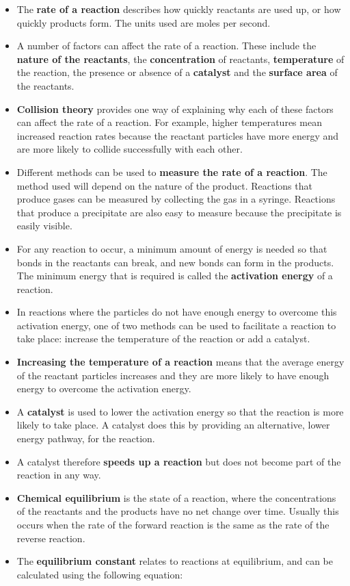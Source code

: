 \begin{itemize}
\item{The \textbf{rate of a reaction} describes how quickly reactants are used up, or how quickly products form. The units used are moles per second.}
\item{A number of factors can affect the rate of a reaction. These include the \textbf{nature of the reactants}, the \textbf{concentration} of reactants, \textbf{temperature} of the reaction, the presence or absence of a \textbf{catalyst} and the \textbf{surface area} of the reactants.}
\item{\textbf{Collision theory} provides one way of explaining why each of these factors can affect the rate of a reaction. For example, higher temperatures mean increased reaction rates because the reactant particles have more energy and are more likely to collide successfully with each other.}
\item{Different methods can be used to \textbf{measure the rate of a reaction}. The method used will depend on the nature of the product. Reactions that produce gases can be measured by collecting the gas in a syringe. Reactions that produce a precipitate are also easy to measure because the precipitate is easily visible.}
\item{For any reaction to occur, a minimum amount of energy is needed so that bonds in the reactants can break, and new bonds can form in the products. The minimum energy that is required is called the \textbf{activation energy} of a reaction.}
\item{In reactions where the particles do not have enough energy to overcome this activation energy, one of two methods can be used to facilitate a reaction to take place: increase the temperature of the reaction or add a catalyst.}
\item{\textbf{Increasing the temperature of a reaction} means that the average energy of the reactant particles increases and they are more likely to have enough energy to overcome the activation energy.}
\item{A \textbf{catalyst} is used to lower the activation energy so that the reaction is more likely to take place. A catalyst does this by providing an alternative, lower energy pathway, for the reaction.}
\item{A catalyst therefore \textbf{speeds up a reaction} but does not become part of the reaction in any way.}
\item{\textbf{Chemical equilibrium} is the state of a reaction, where the concentrations of the reactants and the products have no net change over time. Usually this occurs when the rate of the forward reaction is the same as the rate of the reverse reaction.}
\item{The \textbf{equilibrium constant} relates to reactions at equilibrium, and can be calculated using the following equation:

}
\end{itemize}
